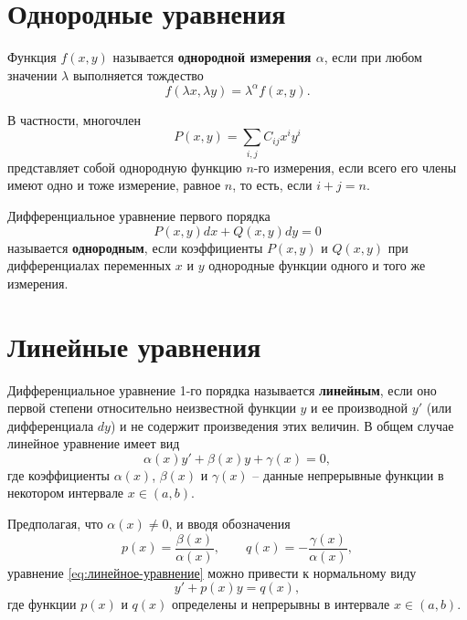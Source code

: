 \documentclass[a5paper, 11pt]{extbook}
\theoremstyle{definition}
\theoremstyle{definition}
\theoremstyle{definition}
\begin{document}
\section{Однородные уравнения}

Функция \(f(x, y)\) называется \textbf{однородной измерения \(\alpha\)}, если при любом значении \(\lambda\) выполняется тождество
\begin{equation}
    f(\lambda x, \lambda y)  = \lambda^{\alpha} f(x, y).
\end{equation}

В частности, многочлен
\[
    P(x, y) = \sum_{i, j} C_{ij} x^i y^i
\]
представляет собой однородную функцию \(n\)-го измерения, если всего его члены имеют одно и тоже измерение, равное \(n\), то есть, если \(i + j = n\).

Дифференциальное уравнение первого порядка
\begin{equation}
    P(x, y) dx + Q(x, y) dy = 0
\end{equation}
называется \textbf{однородным}, если коэффициенты \(P(x, y)\) и \(Q(x, y)\) при дифференциалах переменных \(x\) и \(y\) однородные функции одного и того же измерения.

\section{Линейные уравнения}

Дифференциальное уравнение 1-го порядка называется \textbf{линейным}, если оно первой степени относительно неизвестной функции \(y\) и ее производной \(y'\) (или дифференциала \(dy\)) и не содержит произведения этих величин. В общем случае линейное уравнение имеет вид
\begin{equation}
    \label{eq:линейное-уравнение}
    \alpha(x) y' + \beta(x) y + \gamma(x) = 0,
\end{equation}
где коэффициенты \(\alpha(x)\), \(\beta(x)\) и \(\gamma(x)\) -- данные непрерывные функции в некотором интервале \(x \in (a, b)\).

Предполагая, что \(\alpha(x) \neq 0\), и вводя обозначения
\[
    p(x) = \frac{\beta(x)}{\alpha(x)},
    \qquad
    q(x) = -\frac{\gamma(x)}{\alpha(x)},
\]
уравнение \eqref{eq:линейное-уравнение} можно привести к нормальному виду
\begin{equation}
    \label{eq:нормальное-линейное-уравнение}
    y' + p(x)y = q(x),
\end{equation}
где функции \(p(x)\) и \(q(x)\) определены и непрерывны в интервале \(x \in (a, b)\).
\end{document}
